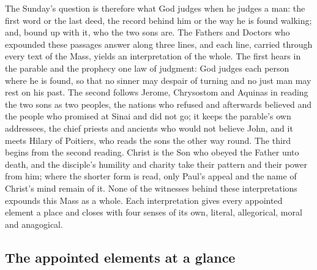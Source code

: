 The Sunday's question is therefore what God judges when he judges a man: the
first word or the last deed, the record behind him or the way he is found
walking; and, bound up with it, who the two sons are. The Fathers and Doctors
who expounded these passages answer along three lines, and each line, carried
through every text of the Mass, yields an interpretation of the whole. The
first hears in the parable and the prophecy one law of judgment: God judges
each person where he is found, so that no sinner may despair of turning and no
just man may rest on his past. The second follows Jerome, Chrysostom and
Aquinas in reading the two sons as two peoples, the nations who refused and
afterwards believed and the people who promised at Sinai and did not go; it
keeps the parable's own addressees, the chief priests and ancients who would
not believe John, and it meets Hilary of Poitiers, who reads the sons the other
way round. The third begins from the second reading. Christ is the Son who
obeyed the Father unto death, and the disciple's humility and charity take
their pattern and their power from him; where the shorter form is read, only
Paul's appeal and the name of Christ's mind remain of it. None of the witnesses
behind these interpretations expounds this Mass as a whole. Each
interpretation gives every appointed element a place and closes with four
senses of its own, literal, allegorical, moral and anagogical.

\subsection{The appointed elements at a glance}

